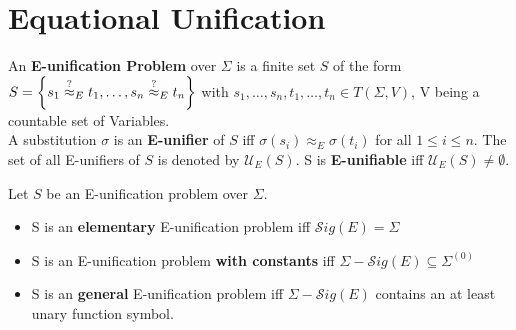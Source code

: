 \section{Equational Unification}
\begin{definition}
An \textbf{E-unification Problem} over $\Sigma$ is a finite set $S$ of the form $S=\left\lbrace s_1\stackrel{?}{\approx}_{E} t_1,\dots,s_n\stackrel{?}{\approx}_{E} t_n\right\rbrace $ with $s_1,\dots,s_n,t_1,\dots,t_n \in T(\Sigma,V)$, V being a countable set of Variables.\\
A substitution $\sigma$ is an \textbf{E-unifier} of $S$ iff $ \sigma(s_i)\approx_E \sigma(t_i)$ for all $1\leq i \leq n$.
The set of all E-unifiers of $S$ is denoted by $\mathcal{U}_E(S)$. S is \textbf{E-unifiable} iff $\mathcal{U}_E(S)\neq \emptyset$.
\end{definition}
\begin{definition}
Let $S$ be an E-unification problem over $\Sigma$.
\begin{itemize}
\item S is an \textbf{elementary} E-unification problem iff $\mathcal{S}ig(E)=\Sigma$
\item S is an E-unification problem \textbf{with constants} iff $\Sigma-\mathcal{S}ig(E)\subseteq\Sigma^{(0)}$
\item S is an \textbf{general} E-unification problem iff $\Sigma-\mathcal{S}ig(E)$ contains an at least unary function symbol.
\end{itemize}
\end{definition}